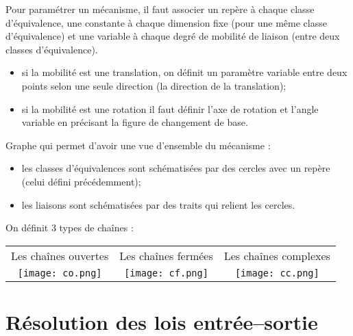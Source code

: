 \begin{methode}
Pour paramétrer un mécanisme, il faut associer un repère à chaque classe d'équivalence, une constante à chaque dimension fixe (pour une même classe d'équivalence) et une variable à chaque degré de mobilité de liaison (entre deux classes d'équivalence). 
\begin{itemize}
\item si la mobilité est une translation, on définit un paramètre variable entre deux points selon une seule direction (la direction de la translation);
\item si la mobilité est une rotation il faut définir l'axe de rotation et l'angle variable en précisant la figure de changement de base.
\end{itemize}
\end{methode}

\begin{defi}

Graphe qui permet d'avoir une vue d'ensemble du mécanisme :
\begin{itemize}
\item les classes d'équivalences sont schématisées par des cercles avec un repère (celui défini précédemment);
\item les liaisons sont schématisées par des traits qui relient les cercles.
\end{itemize}

On définit 3 types de chaînes :
\begin{center}
\begin{tabular}{ccc}
Les chaînes ouvertes & Les chaînes fermées & Les chaînes complexes \\
\texttt{[image: co.png]}
&
\texttt{[image: cf.png]}
&
\texttt{[image: cc.png]}\\
\end{tabular}
\end{center}
\end{defi}


\section{Résolution des lois entrée--sortie}



